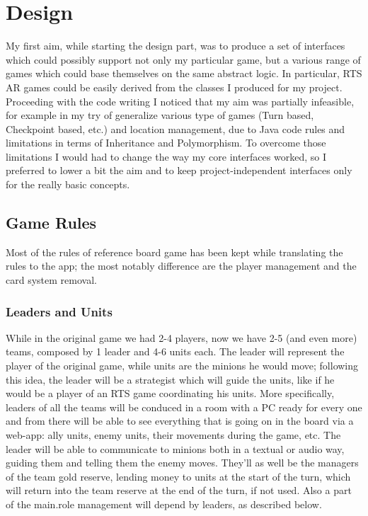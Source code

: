 \chapter{Design}

	My first aim, while starting the design part, was to produce a set of interfaces which could possibly support not only my particular game, but a various range of games which could base themselves on the same abstract logic.
	In particular, RTS AR games could be easily derived from the classes I produced for my project.
	Proceeding with the code writing I noticed that my aim was partially infeasible, for example in my try of generalize various type of games (Turn based, Checkpoint based, etc.) and location management, due to Java code rules and limitations in terms of Inheritance and Polymorphism.
	To overcome those limitations I would had to change the way my core interfaces worked, so I preferred to lower a bit the aim and to keep project-independent interfaces only for the really basic concepts.

	\section{Game Rules}
		
		Most of the rules of reference board game has been kept while translating the rules to the app; the most notably difference are the player management and the card system removal.
		
		\subsection{Leaders and Units}
		
			While in the original game we had 2-4 players, now we have 2-5 (and even more) teams, composed by 1 leader and 4-6 units each.
			The leader will represent the player of the original game, while units are the minions he would move; following this idea, the leader will be a strategist which will guide the units, like if he would be a player of an RTS game coordinating his units.
			More specifically, leaders of all the teams will be conduced in a room with a PC ready for every one and from there will be able to see everything that is going on in the board via a web-app: ally units, enemy units, their movements during the game, etc.
			The leader will be able to communicate to minions both in a textual or audio way, guiding them and telling them the enemy moves.
			They'll as well be the managers of the team gold reserve, lending money to units at the start of the turn, which will return into the team reserve at the end of the turn, if not used.
			Also a part of the main.role management will depend by leaders, as described below.
		
